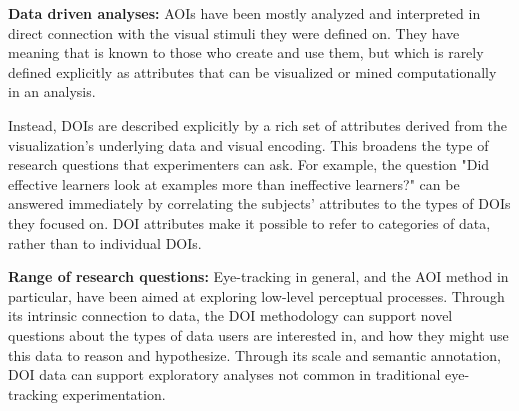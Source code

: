 \vspace{2mm}

\noindent \textbf{Data driven analyses: } AOIs have been mostly analyzed and interpreted in direct connection with the visual stimuli they were defined on. They have meaning that is known to those who create and use them, but which is rarely defined explicitly as attributes that can be visualized or mined computationally in an analysis.  

Instead, DOIs are described explicitly by a rich set of attributes derived from the visualization's underlying data and visual encoding. This broadens the type of research questions that experimenters can ask. For example, the question "Did effective learners look at examples more than ineffective learners?" can be answered immediately by correlating the subjects' attributes to the types of DOIs they focused on. DOI attributes make it possible to refer to categories of data, rather than to individual DOIs.

\vspace{2mm}

\noindent \textbf{Range of research questions: } Eye-tracking in general, and the AOI method in particular, have been aimed at exploring low-level perceptual processes. Through its intrinsic connection to data, the DOI methodology can support novel questions about the types of data users are interested in, and how they might use this data to reason and hypothesize. Through its scale and semantic annotation, DOI data can support exploratory analyses not common in traditional eye-tracking experimentation.




